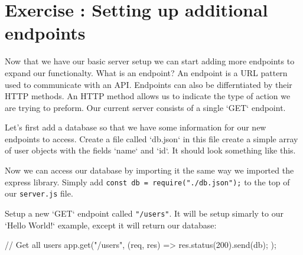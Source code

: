 \documentclass{42-en}
\begin{document}

\newpage
\nextexercice


\chapter{Exercise \exercicenumber: Setting up additional endpoints}

Now that we have our basic server setup we can start adding more endpoints to 
expand our functionalty. What is an endpoint? An endpoint is a URL pattern used 
to communicate with an API. Endpoints can also be differntiated by their HTTP 
methods. An HTTP method allows us to indicate the type of action we are trying 
to preform. Our current server consists of a single `GET` endpoint.


Let's first add a database so that we have some information for our new endpoints to access. Create a file called `db.json` in this file create a simple array of user objects with the fields `name` and `id`. It should look something like this.
	\begin{42jscode}
	\end{42jscode}

Now we can access our database by importing it the same way we imported the express library. Simply add \texttt{const db = require("./db.json");} to the top of our \texttt{server.js} file.

Setup a new `GET` endpoint called \texttt{"/users"}. It will be setup simarly to our `Hello World!` example, except it will return our database:
	\begin{42jscode}
	// Get all users
	app.get("/users", (req, res) => {
	res.status(200).send(db);
	});
	\end{42jscode}
\end{document}
